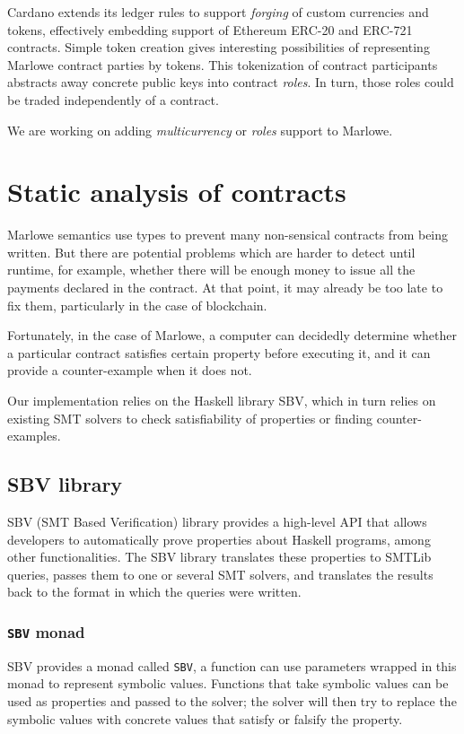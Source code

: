 \documentclass[runningheads]{llncs}
\begin{document}
Cardano extends its ledger rules to support \emph{forging} of custom currencies and tokens,
effectively embedding support of Ethereum ERC-20 and ERC-721 contracts. 
Simple token creation gives interesting possibilities of representing Marlowe contract parties by tokens.
This tokenization of contract participants abstracts away concrete public keys into contract \emph{roles}.
In turn, those roles could be traded independently of a contract.

We are working on adding \emph{multicurrency} or \emph{roles} support to Marlowe.

\section{Static analysis of contracts\label{sec:static}}

Marlowe semantics use types to prevent many non-sensical contracts from being written. But there are potential problems which are harder to detect until runtime, for example, whether there will be enough money to issue all the payments declared in the contract. At that point, it may already be too late to fix them, particularly in the case of blockchain.

Fortunately, in the case of Marlowe, a computer can decidedly determine whether a particular contract satisfies certain property before executing it, and it can provide a counter-example when it does not.

Our implementation relies on the Haskell library SBV, which in turn relies on existing SMT solvers to check satisfiability of properties or finding counter-examples.

\subsection{SBV library}

SBV \cite{SBV} (SMT Based Verification) library provides a high-level API that allows developers to automatically prove properties about Haskell programs, among other functionalities.
The SBV library translates these properties to SMTLib queries, passes them to one or several SMT solvers, and translates the results back to the format in which the queries were written.

\subsubsection{\texttt{SBV} monad}

SBV provides a monad called \texttt{SBV}, a function can use parameters wrapped in this monad to represent symbolic values. Functions that take symbolic values can be used as properties and passed to the solver; the solver will then try to replace the symbolic values with concrete values that satisfy or falsify the property.
\end{document}
